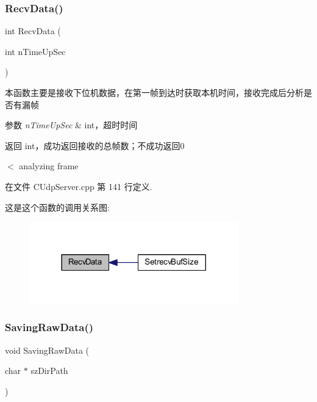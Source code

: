 \subsubsection{\texorpdfstring{Recv\+Data()}{RecvData()}}
{\footnotesize\ttfamily int Recv\+Data (\begin{DoxyParamCaption}\item[{int}]{n\+Time\+Up\+Sec }\end{DoxyParamCaption})}



本函数主要是接收下位机数据，在第一帧到达时获取本机时间，接收完成后分析是否有漏帧 


\begin{DoxyParams}{参数}
{\em n\+Time\+Up\+Sec} & int，超时时间 \\
\hline
\end{DoxyParams}
\begin{DoxyReturn}{返回}
int，成功返回接收的总帧数；不成功返回0 
\end{DoxyReturn}
$<$ analyzing frame 

在文件 C\+Udp\+Server.\+cpp 第 141 行定义.

这是这个函数的调用关系图\+:\nopagebreak
\begin{figure}[H]
\begin{center}
\leavevmode
\includegraphics[width=257pt]{class_c_udp_server_a21fbbdcc6e88473bae9488405dcc9b95_icgraph}
\end{center}
\end{figure}
\mbox{\label{class_c_udp_server_a47ad892f309e7274cc2938c7cee7ba1f}} 
\subsubsection{\texorpdfstring{Saving\+Raw\+Data()}{SavingRawData()}}
{\footnotesize\ttfamily void Saving\+Raw\+Data (\begin{DoxyParamCaption}\item[{char $\ast$}]{sz\+Dir\+Path }\end{DoxyParamCaption})}



